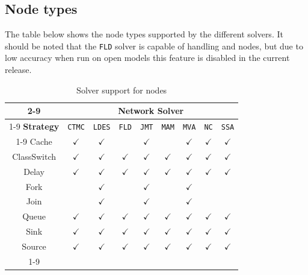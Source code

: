 \subsection{Node types}
The table below shows the node types supported by the different solvers. It should be noted that the \texttt{FLD} solver is capable of handling  and  nodes, but due to low accuracy when run on open models this feature is disabled in the current release.

\begin{table}[ht!]
\renewcommand{\arraystretch}{1.2}
\centering
\caption{Solver support for  nodes}
{\small
\begin{tabular}{|c|c|c|c|c|c|c|c|c|}
\cline{2-9}
\multicolumn{1}{c|}{}&\multicolumn{8}{c|}{\textbf{Network Solver}}\\
\cline{1-9}
\textbf{Strategy}	&\texttt{CTMC}&\texttt{LDES}&\texttt{FLD} 	&\texttt{JMT} 	&\texttt{MAM}	&\texttt{MVA}	&\texttt{NC}	&\texttt{SSA}	\\
\cline{1-9}
Cache	& $\checkmark$ & $\checkmark$ &&   $\checkmark$	& &$\checkmark$ &$\checkmark$ & $\checkmark$ \\
ClassSwitch	&$\checkmark$	& $\checkmark$ &  $\checkmark$		&  	$\checkmark$  	& $\checkmark$& $\checkmark$	& $\checkmark$& $\checkmark$ \\
Delay	&$\checkmark$	& $\checkmark$ &  $\checkmark$		&  	$\checkmark$  	& $\checkmark$& $\checkmark$	& $\checkmark$& $\checkmark$ \\
Fork	&& $\checkmark$ & 	& $\checkmark$ 	& & $\checkmark$ & &  \\
Join	&& $\checkmark$ & 	& $\checkmark$	& & $\checkmark$ & &  \\
Queue	&$\checkmark$	& $\checkmark$ &  $\checkmark$		&  	$\checkmark$  	& $\checkmark$& $\checkmark$	& $\checkmark$& $\checkmark$ \\
Sink	&$\checkmark$	& $\checkmark$ &  $\checkmark$		&  	$\checkmark$  	& $\checkmark$& $\checkmark$	& $\checkmark$& $\checkmark$ \\
Source	&$\checkmark$	& $\checkmark$ & $\checkmark$		&  	$\checkmark$  	& $\checkmark$& $\checkmark$	& $\checkmark$& $\checkmark$ \\
\cline{1-9}
\end{tabular}}
\label{TAB_solver_nodes}
\end{table}

